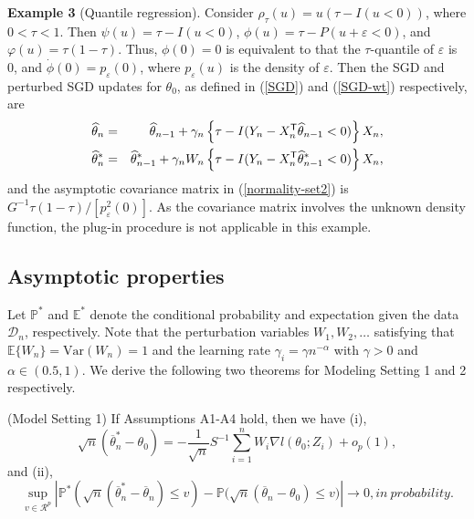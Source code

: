 \documentclass[12pt]{article}
\def\trans{^{\rm \textsf{T}}}
\def\wh{\widehat}
\def\ol{\overline}
\begin{document}
{\bf Example 3} (Quantile regression). Consider $\rho_\tau(u)=u(\tau-I(u<0))$, where $0<\tau<1$. Then $\psi(u)=\tau-I(u<0)$, $\phi(u)=\tau-P(u+\varepsilon<0)$, and $\varphi(u)=\tau(1-\tau)$. Thus, $\phi(0)=0$ is equivalent to that the $\tau$-quantile  of $\varepsilon$ is 0, and  $\dot{\phi}(0)=p_{\varepsilon}(0)$, where $p_{\varepsilon}(u)$ is the density of $\varepsilon$. Then the SGD and perturbed SGD updates for $\theta_0$, as defined in (\ref{SGD}) and (\ref{SGD-wt}) respectively, are
\begin{eqnarray}
\wh{\theta}_n&=&\wh{\theta}_{n-1}+\gamma_n\left\{\tau-I(Y_n-X_n\trans\wh{\theta}_{n-1}<0)\right\}X_n,\label{eg3-sgd}\\
\wh{\theta}^*_n&=&\wh{\theta}^*_{n-1}+\gamma_nW_n\left\{\tau-I(Y_n-X_n\trans\wh{\theta}^*_{n-1}<0)\right\}X_n,\label{eg3-sgd-rw}
\end{eqnarray}
and the asymptotic covariance matrix in (\ref{normality-set2}) is $G^{-1}\tau(1-\tau)/[p^2_{\varepsilon}(0)]$.
As the covariance matrix involves the unknown density function, the
plug-in procedure is not applicable in this example.

\subsection{Asymptotic properties}

Let $\mathbb{P}^*$ and $\mathbb{E}^*$ denote the conditional probability and expectation given the data $\mathcal{D}_n$, respectively. Note that
the perturbation variables $W_1, W_2, \dots$ satisfying that $\mathbb{E}\{W_n\}=\mbox{Var}(W_n)=1$ and
the learning rate $\gamma_i=\gamma n^{-\alpha}$ with $\gamma>0$ and $\alpha\in(0.5, 1)$. We derive the following two theorems for Modeling Setting 1 and 2 respectively.

{\Theorem (Model Setting 1) If Assumptions A1-A4 hold, then we have (i),
\begin{equation}\label{eq-th1}
\sqrt{n}(\ol{\theta}_n^*-\theta_0)=-\frac{1}{\sqrt{n}}S^{-1}\sum_{i=1}^n W_i \nabla l(\theta_0; Z_i)+o_p(1),
\end{equation}
and (ii),
\begin{equation}\label{eq-co}
\sup_{v\in\mathcal{R}^p}\left|\mathbb{P}^*\left(\sqrt{n}(\ol{\theta}^*_n-\ol{\theta}_n)\leq v\right)-\mathbb{P}\Big(\sqrt{n}(\ol{\theta}_n-\theta_0)\leq v\Big)\right| \rightarrow 0, {in\ probability. }
\end{equation}
}
\end{document}
